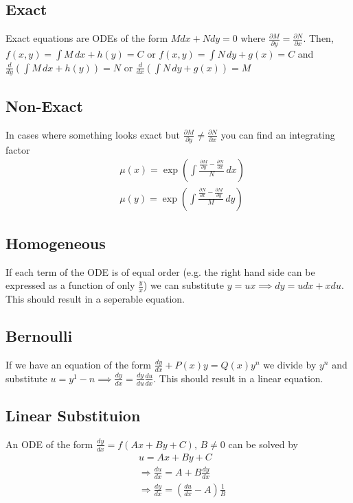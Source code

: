 \documentclass[10pt,landscape,letterpaper]{cheatsheet}
\begin{document}
\subsection*{Exact}
Exact equations are ODEs of the form $Mdx+Ndy=0$ where $\frac{\partial M}{\partial y}=\frac{\partial N}{\partial x}$. Then, $f(x,y)=\int M\,dx+h(y)=C$ or $f(x,y)=\int N\,dy+g(x)=C$
and $\frac{d}{dy}\left(\int M\,dx+h(y)\right)=N$ or $\frac{d}{dx}\left(\int N\,dy+g(x)\right)=M$
\subsection*{Non-Exact}
In cases where something looks exact but $\frac{\partial M}{\partial y}\neq\frac{\partial N}{\partial x}$ you can find an integrating factor 
\begin{align*}
         & \mu(x)=\exp\left(\int \frac{\frac{\partial M}{\partial y}-\frac{\partial N}{\partial x}}{N}\,dx\right) \\
         & \mu(y)=\exp\left(\int \frac{\frac{\partial N}{\partial x}-\frac{\partial M}{\partial y}}{M}\,dy\right)
\end{align*}
\subsection*{Homogeneous}
If each term of the ODE is of equal order (e.g. the right hand side can be expressed as a function of only $\frac{y}{x}$) we can substitute 
$y=ux\implies dy=udx+xdu$. This should result in a seperable equation.
\subsection*{Bernoulli}
If we have an equation of the form $\frac{dy}{dx}+P(x)y=Q(x)y^n$ we divide by $y^n$ and substitute $u=y^1-n\implies \frac{dy}{dx}=\frac{dy}{du}\frac{du}{dx}$. This should result in a linear equation.
\subsection*{Linear Substituion}
An ODE of the form $\frac{dy}{dx}=f(Ax+By+C), \, B\neq 0$ can be solved by
\begin{align*}
        &u = Ax+By+C \\
        &\Rightarrow \frac{du}{dx}=A+B\frac{dy}{dx}\\
        &\Rightarrow \frac{dy}{dx}=(\frac{du}{dx}-A)\frac{1}{B}\\
\end{align*}
\end{document}
